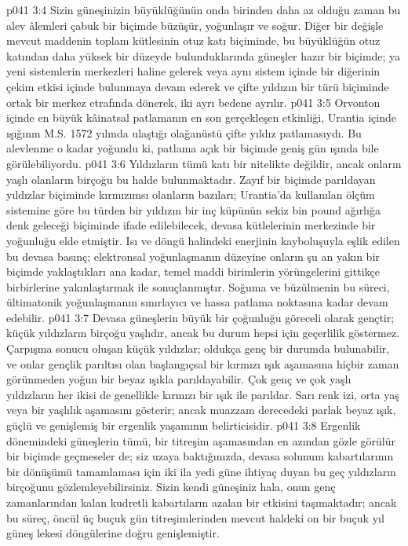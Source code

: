 \vs p041 3:4 Sizin güneşinizin büyüklüğünün onda birinden daha az olduğu zaman bu alev âlemleri çabuk bir biçimde büzüşür, yoğunlaşır ve soğur. Diğer bir değişle mevcut maddenin toplam kütlesinin otuz katı biçiminde, bu büyüklüğün otuz katından daha yüksek bir düzeyde bulunduklarında güneşler hazır bir biçimde; ya yeni sistemlerin merkezleri haline gelerek veya aynı sistem içinde bir diğerinin çekim etkisi içinde bulunmaya devam ederek ve çifte yıldızın bir türü biçiminde ortak bir merkez etrafında dönerek, iki ayrı bedene ayrılır.
\vs p041 3:5 Orvonton içinde en büyük kâinatsal patlamanın en son gerçekleşen etkinliği, Urantia içinde ışığının M.S. 1572 yılında ulaştığı olağanüstü çifte yıldız patlamasıydı. Bu alevlenme o kadar yoğundu ki, patlama açık bir biçimde geniş gün ışında bile görülebiliyordu.
\vs p041 3:6 Yıldızların tümü katı bir nitelikte değildir, ancak onların yaşlı olanların birçoğu bu halde bulunmaktadır. Zayıf bir biçimde parıldayan yıldızlar biçiminde kırmızımsı olanların bazıları; Urantia’da kullanılan ölçüm sistemine göre bu türden bir yıldızın bir inç küpünün sekiz bin pound ağırlığa denk geleceği biçiminde ifade edilebilecek, devasa kütlelerinin merkezinde bir yoğunluğu elde etmiştir. Isı ve döngü halindeki enerjinin kayboluşuyla eşlik edilen bu devasa basınç; elektronsal yoğunlaşmanın düzeyine onların şu an yakın bir biçimde yaklaştıkları ana kadar, temel maddi birimlerin yörüngelerini gittikçe birbirlerine yakınlaştırmak ile sonuçlanmıştır. Soğuma ve büzülmenin bu süreci, ültimatonik yoğunlaşmanın sınırlayıcı ve hassa patlama noktasına kadar devam edebilir.
\vs p041 3:7 Devasa güneşlerin büyük bir çoğunluğu göreceli olarak gençtir; küçük yıldızların birçoğu yaşlıdır, ancak bu durum hepsi için geçerlilik göstermez. Çarpışma sonucu oluşan küçük yıldızlar; oldukça genç bir durumda bulunabilir, ve onlar gençlik parıltısı olan başlangıçsal bir kırmızı ışık aşamasına hiçbir zaman görünmeden yoğun bir beyaz ışıkla parıldayabilir. Çok genç ve çok yaşlı yıldızların her ikisi de genellikle kırmızı bir ışık ile parıldar. Sarı renk izi, orta yaş veya bir yaşlılık aşamasını gösterir; ancak muazzam derecedeki parlak beyaz ışık, güçlü ve genişlemiş bir ergenlik yaşamının belirticisidir.
\vs p041 3:8 Ergenlik dönemindeki güneşlerin tümü, bir titreşim aşamasından en azından gözle görülür bir biçimde geçmeseler de; siz uzaya baktığınızda, devasa solunum kabartılarının bir dönüşümü tamamlaması için iki ila yedi güne ihtiyaç duyan bu geç yıldızların birçoğunu gözlemleyebilirsiniz. Sizin kendi güneşiniz hala, onun genç zamanlarından kalan kudretli kabartıların azalan bir etkisini taşımaktadır; ancak bu süreç, öncül üç buçuk gün titreşimlerinden mevcut haldeki on bir buçuk yıl güneş lekesi döngülerine doğru genişlemiştir.
